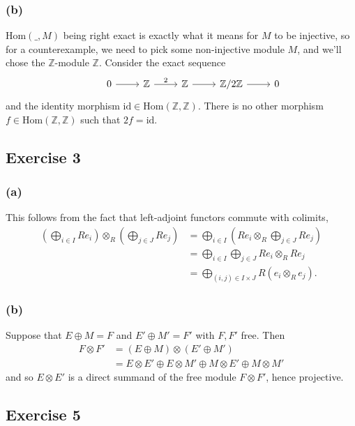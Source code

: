 \documentclass{article}
\theoremstyle{definition}
\newcommand{\Z}{\mathbb{Z}}
\newcommand{\Hom}{\text{Hom}}
\newcommand{\id}{\text{id}}
\begin{document}
\subsubsection*{(b)}

$\Hom(\_, M)$ being right exact is exactly what it means for $M$ to be injective, so for a counterexample,
we need to pick some non-injective module $M$, and we'll chose the $\Z$-module $\Z$. Consider the exact sequence
\[
\begin{tikzcd}
	& 0
	\arrow{r}
	& \Z
	\arrow{r}{2} 
	& \Z
	\arrow{r}
	& \Z/2\Z
	\arrow{r}
	& 0
\end{tikzcd}
\]
and the identity morphism $\id \in \Hom(\Z, \Z)$. There is no other morphism $f
\in \Hom(\Z, \Z)$ such that $2 f = \id$.

\subsection*{Exercise 3}
\subsubsection*{(a)}

This follows from the fact that left-adjoint functors commute with colimits,
\begin{align*}
	\left(
		\bigoplus_{i \in I} R e_i
	\right)
	\otimes_{R}
	\left(
		\bigoplus_{j \in J} R e_j
	\right)
	&=
	\bigoplus_{i \in I} 
	\left(
		R e_i \otimes_{R} \bigoplus_{j \in J} R e_j
	\right) \\
	&=
	\bigoplus_{i \in I} 
	\bigoplus_{j \in J} 
	R e_i \otimes_{R} R e_j \\
	&=
	\bigoplus_{(i, j) \in I \times J} 
	R (e_i \otimes_{R} e_j).
\end{align*}

\subsubsection*{(b)}

Suppose that $E \oplus M = F$ and $E' \oplus M' = F'$ with $F, F'$ free. Then
\begin{align*}
	F \otimes F'
	&=
	(E \oplus M) 
	\otimes
	(E' \oplus M') \\
	&=
	E \otimes E'
	\oplus
	E \otimes M'
	\oplus
	M \otimes E'
	\oplus
	M \otimes M'
\end{align*} 
and so $E \otimes E'$ is a direct summand of the free module $F \otimes F'$, hence projective.

\subsection*{Exercise 5}
\end{document}
